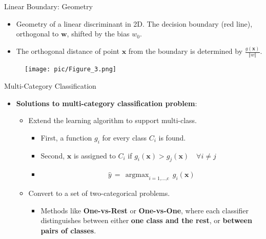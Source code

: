 \documentclass[serif, aspectratio=169]{beamer}
\DeclareMathOperator*{\argmax}{argmax}
\begin{document}
\begin{frame}{Linear Boundary: Geometry}
    \begin{center}
    \begin{itemize}
        \item \justifying Geometry of a linear discriminant in 2D. The decision boundary (red line), orthogonal to \(\mathbf{w}\), shifted by the bias \(w_0\).
        \item[] \justifying The orthogonal distance of point 
\(\mathbf{x}\) from the boundary is determined by \(\frac{g(\mathbf{x})}{\Vert w \Vert}\).
    \end{itemize}
    \endminipage
    \hfill
    \begin{figure}[bh]
        \texttt{[image: pic/Figure\_3.png]}
    \end{figure}
    
    \endminipage
        
    \end{center}
\end{frame}

\begin{frame}{Multi-Category Classification}
    \begin{itemize}
        \item \textbf{Solutions to multi-category classification problem}:
        \medskip
        \begin{itemize}\itemsep1.5em
            \item Extend the learning algorithm to support multi-class.
            \medskip
            \begin{itemize}\itemsep1em
                \item First, a function \(g_i\) for every class \(C_i\) is found.
                \item Second, \(\mathbf{x}\) is assigned to \(C_i\) if \(g_i(\mathbf{x}) > g_j(\mathbf{x}) \quad \forall i \neq j\)
                \item[] \[\hat{y} \, = \, \argmax_{i=\text{1,...,c}} \, g_i(\mathbf{x})\]
            \end{itemize}
            \item Convert to a set of two-categorical problems.
            \medskip
            \begin{itemize}
                \item Methods like \textbf{One-vs-Rest} or \textbf{One-vs-One}, where each classifier distinguishes between either \textbf{one class and the rest}, or \textbf{between pairs of classes}.
            \end{itemize}
        \end{itemize}
    \end{itemize}
\end{frame}
\end{document}
